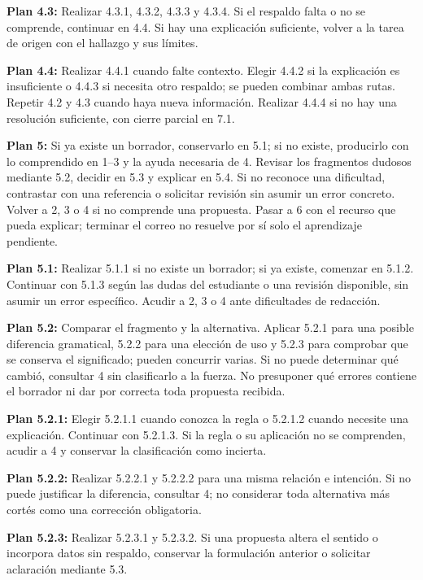 \documentclass[10pt,a4paper]{article}
\begin{document}
\textbf{Plan 4.3:} Realizar 4.3.1, 4.3.2, 4.3.3 y 4.3.4. Si el respaldo falta o no se comprende, continuar en 4.4. Si hay una explicación suficiente, volver a la tarea de origen con el hallazgo y sus límites.\par
\textbf{Plan 4.4:} Realizar 4.4.1 cuando falte contexto. Elegir 4.4.2 si la explicación es insuficiente o 4.4.3 si necesita otro respaldo; se pueden combinar ambas rutas. Repetir 4.2 y 4.3 cuando haya nueva información. Realizar 4.4.4 si no hay una resolución suficiente, con cierre parcial en 7.1.\par
\textbf{Plan 5:} Si ya existe un borrador, conservarlo en 5.1; si no existe, producirlo con lo comprendido en 1--3 y la ayuda necesaria de 4. Revisar los fragmentos dudosos mediante 5.2, decidir en 5.3 y explicar en 5.4. Si no reconoce una dificultad, contrastar con una referencia o solicitar revisión sin asumir un error concreto. Volver a 2, 3 o 4 si no comprende una propuesta. Pasar a 6 con el recurso que pueda explicar; terminar el correo no resuelve por sí solo el aprendizaje pendiente.\par
\textbf{Plan 5.1:} Realizar 5.1.1 si no existe un borrador; si ya existe, comenzar en 5.1.2. Continuar con 5.1.3 según las dudas del estudiante o una revisión disponible, sin asumir un error específico. Acudir a 2, 3 o 4 ante dificultades de redacción.\par
\textbf{Plan 5.2:} Comparar el fragmento y la alternativa. Aplicar 5.2.1 para una posible diferencia gramatical, 5.2.2 para una elección de uso y 5.2.3 para comprobar que se conserva el significado; pueden concurrir varias. Si no puede determinar qué cambió, consultar 4 sin clasificarlo a la fuerza. No presuponer qué errores contiene el borrador ni dar por correcta toda propuesta recibida.\par
\textbf{Plan 5.2.1:} Elegir 5.2.1.1 cuando conozca la regla o 5.2.1.2 cuando necesite una explicación. Continuar con 5.2.1.3. Si la regla o su aplicación no se comprenden, acudir a 4 y conservar la clasificación como incierta.\par
\textbf{Plan 5.2.2:} Realizar 5.2.2.1 y 5.2.2.2 para una misma relación e intención. Si no puede justificar la diferencia, consultar 4; no considerar toda alternativa más cortés como una corrección obligatoria.\par
\textbf{Plan 5.2.3:} Realizar 5.2.3.1 y 5.2.3.2. Si una propuesta altera el sentido o incorpora datos sin respaldo, conservar la formulación anterior o solicitar aclaración mediante 5.3.\par
\end{document}
